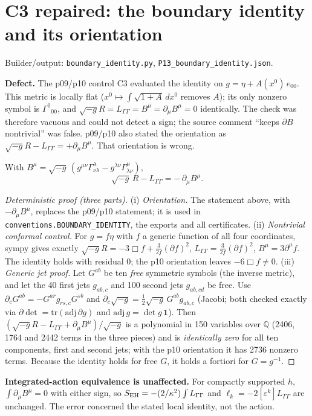 \section{C3 repaired: the boundary identity and its orientation}
\noindent Builder/output: \texttt{boundary\_identity.py}, \texttt{P13\_boundary\_identity.json}.\par\smallskip
\textbf{Defect.} The p09/p10 control C3 evaluated the identity on $g=\eta+A(x^0)\,e_{00}$. This metric is locally
flat ($x^0\mapsto\int\sqrt{1+A}\,dx^0$ removes $A$); its only nonzero symbol is $\Gamma^0{}_{00}$, and
$\sqrt{-g}R=L_{\Gamma\Gamma}=B^\mu=\partial_\mu B^\mu=0$ identically. The check was therefore vacuous and could not
detect a sign; the source comment ``keeps $\partial B$ nontrivial'' was false. p09/p10 also stated the orientation as
$\sqrt{-g}R-L_{\Gamma\Gamma}=+\partial_\mu B^\mu$. That orientation is wrong.

\begin{proposition}
With $B^\mu=\sqrt{-g}\,(g^{\mu\nu}\Gamma^\lambda_{\nu\lambda}-g^{\lambda\nu}\Gamma^\mu_{\lambda\nu})$,
\[\sqrt{-g}\,R-L_{\Gamma\Gamma}=-\,\partial_\mu B^\mu .\]
\end{proposition}
\begin{proof}[Deterministic proof (three parts)]
(i) \emph{Orientation.} The statement above, with $-\partial_\mu B^\mu$, replaces the p09/p10 statement; it is used in
\texttt{conventions.BOUNDARY\_IDENTITY}, the exports and all certificates.
(ii) \emph{Nontrivial conformal control.} For $g=f\eta$ with $f$ a generic function of all four coordinates, sympy gives
exactly $\sqrt{-g}R=-3\Box f+\tfrac{3}{2f}(\partial f)^2$, $L_{\Gamma\Gamma}=\tfrac{3}{2f}(\partial f)^2$,
$B^\mu=3\partial^\mu f$. The identity holds with residual $0$; the p10 orientation leaves $-6\Box f\neq0$.
(iii) \emph{Generic jet proof.} Let $G^{ab}$ be ten \emph{free} symmetric symbols (the inverse metric), and let the
40 first jets $g_{ab,c}$ and 100 second jets $g_{ab,cd}$ be free. Use $\partial_cG^{ab}=-G^{ar}g_{rs,c}G^{sb}$ and
$\partial_c\sqrt{-g}=\tfrac12\sqrt{-g}\,G^{ab}g_{ab,c}$ (Jacobi; both checked exactly via $\partial\det=\mathrm{tr}(\mathrm{adj}\,\partial g)$
and $\mathrm{adj}\,g=\det g\,\mathbf 1$). Then $(\sqrt{-g}R-L_{\Gamma\Gamma}+\partial_\mu B^\mu)/\sqrt{-g}$ is a polynomial in
150 variables over $\mathbb Q$ (2406, 1764 and 2442 terms in the three pieces) and is \emph{identically zero} for all ten
components, first and second jets; with the p10 orientation it has 2736 nonzero terms. Because the identity holds for
free $G$, it holds a fortiori for $G=g^{-1}$.
\end{proof}
\textbf{Integrated-action equivalence is unaffected.} For compactly supported $h$, $\int\partial_\mu B^\mu=0$ with either
sign, so $S_{\rm EH}=-(2/\kappa^2)\int L_{\Gamma\Gamma}$ and $\ell_k=-2[\varepsilon^k]L_{\Gamma\Gamma}$ are unchanged. The
error concerned the stated local identity, not the action.

